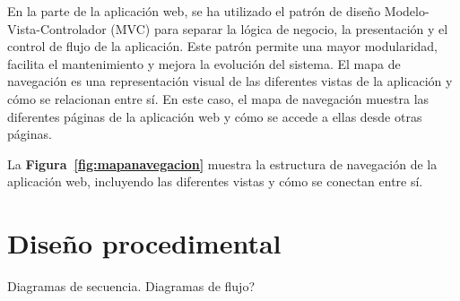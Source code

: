 En la parte de la aplicación web, se ha utilizado el patrón de diseño Modelo-Vista-Controlador (MVC) para separar la lógica de negocio, la presentación y el control de flujo de la aplicación. Este patrón permite una mayor modularidad, facilita el mantenimiento y mejora la evolución del sistema. 
El mapa de navegación es una representación visual de las diferentes vistas de la aplicación y cómo se relacionan entre sí. En este caso, el mapa de navegación muestra las diferentes páginas de la aplicación web y cómo se accede a ellas desde otras páginas.

La \textbf{Figura~\ref{fig:mapanavegacion}} muestra la estructura de navegación de la aplicación web, incluyendo las diferentes vistas y cómo se conectan entre sí.

\section{Diseño procedimental}

Diagramas de secuencia. Diagramas de flujo?